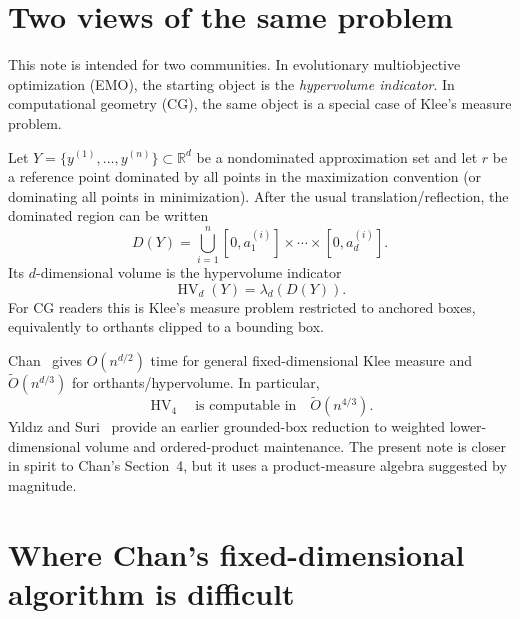 \documentclass[12pt,a4paper]{article}
\theoremstyle{definition}
\newcommand{\HV}{\operatorname{HV}}
\newcommand{\1}{\mathbf 1}
\newcommand{\R}{\mathbb R}
\newcommand{\wtO}{\widetilde O}
\begin{document}
\begin{abstract}
The cutting recursion is unchanged, so the resulting grounded-hypervolume algorithm retains Chan's $\widetilde O(n^{d/3})$ bound: $\widetilde O(n^{4/3})$ in $4D$, $\widetilde O(n^2)$ in $6D$, and $\widetilde O(n^{8/3})$ in $8D$. The contribution is a uniform pair-elimination simplification of the existing exponent, not an improvement to $n^{d/4}$; the latter would still require a genuine simplification of locally three-sided orthants. The $4D$ identities have been audited against exact oracles; the higher-dimensional theorem is proved structurally here but has not yet been implemented or experimentally audited.
\end{abstract}

\section{Two views of the same problem}

This note is intended for two communities. In evolutionary multiobjective optimization (EMO), the starting object is the \emph{hypervolume indicator}. In computational geometry (CG), the same object is a special case of Klee's measure problem.

Let $Y=\{y^{(1)},\dots,y^{(n)}\}\subset\R^d$ be a nondominated approximation set and let $r$ be a reference point dominated by all points in the maximization convention (or dominating all points in minimization). After the usual translation/reflection, the dominated region can be written
\[
D(Y)=\bigcup_{i=1}^n [0,a^{(i)}_1]\times\cdots\times[0,a^{(i)}_d].
\]
Its $d$-dimensional volume is the hypervolume indicator
\[
\HV_d(Y)=\lambda_d(D(Y)).
\]
For CG readers this is Klee's measure problem restricted to anchored boxes, equivalently to orthants clipped to a bounding box.

Chan~\cite{Chan2013} gives $O(n^{d/2})$ time for general fixed-dimensional Klee measure and $\wtO(n^{d/3})$ for orthants/hypervolume. In particular,
\[
\HV_4\quad\text{is computable in}\quad \wtO(n^{4/3}).
\]
Y\i ld\i z and Suri~\cite{YildizSuri2012} provide an earlier grounded-box reduction to weighted lower-dimensional volume and ordered-product maintenance. The present note is closer in spirit to Chan's Section~4, but it uses a product-measure algebra suggested by magnitude.

\section{Where Chan's fixed-dimensional algorithm is difficult}
\end{document}
